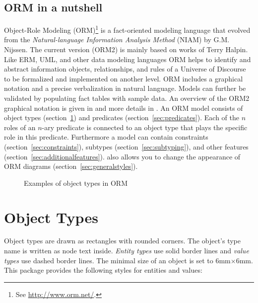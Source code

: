 \documentclass[a4paper,10pt]{article}
\begin{document}
\subsection*{ORM in a nutshell}
Object-Role Modeling (ORM)\footnote{See \url{http://www.orm.net/}.} is a fact-oriented modeling language that evolved from the \textit{Natural-language Information Analysis Method} (NIAM) by G.M. Nijssen. The current version (ORM2) is mainly based on works of Terry Halpin. Like ERM, UML, and other data modeling languages ORM helps to identify and abstract information objects, relationships, and rules of a Universe of Discourse to be formalized and implemented on another level. ORM includes a graphical notation and a precise verbalization in natural language. Models can further be validated by populating fact tables with sample data. An overview of the ORM2 graphical notation is given in \cite{Halpin2005} and more details in \cite{Halpin2008}. An ORM model consists of object types (section~\ref{sec:objecttypes}) and predicates  (section~\ref{sec:predicates}). Each of the $n$ roles of an $n$-ary predicate is connected to an object type that plays the specific role in this predicate. Furthermore a model can contain constraints (section~\ref{sec:constraints}), subtypes (section~\ref{sec:subtyping}), and other features (section~\ref{sec:additionalfeatures}). \tkzorm also allows you to change the appearance of ORM diagrams (section~\ref{sec:generalstyles}).

\begin{figure}[ht]
  \caption{Examples of object types in ORM}
\end{figure}

\pagebreak
\section{Object Types}
\label{sec:objecttypes}
Object types are drawn as rectangles with rounded corners. The object's type name is written as node text inside. \emph{Entity types} use solid border lines and \emph{value types} use dashed border lines. The minimal size of an object is set to 6mm$\times$6mm. This package provides the following styles for entities and values:
\end{document}
